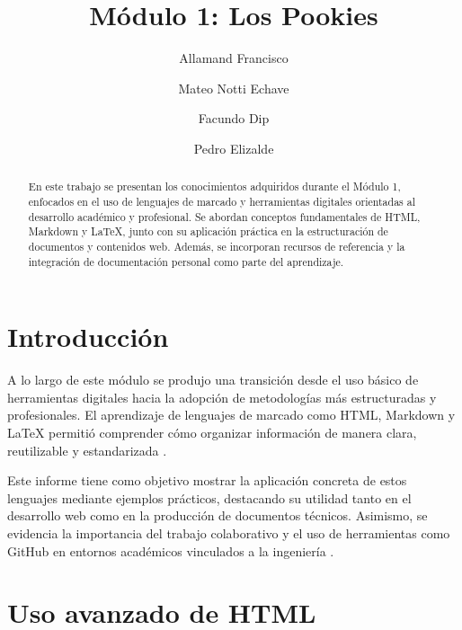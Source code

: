 \documentclass[runningheads]{llncs}
\begin{document}
\title{Módulo 1: Los Pookies}

\author{Allamand Francisco \and
Mateo Notti Echave \and
Facundo Dip \and
Pedro Elizalde}




\maketitle

\begin{abstract}
En este trabajo se presentan los conocimientos adquiridos durante el Módulo 1, enfocados en el uso de lenguajes de marcado y herramientas digitales orientadas al desarrollo académico y profesional. Se abordan conceptos fundamentales de HTML, Markdown y LaTeX, junto con su aplicación práctica en la estructuración de documentos y contenidos web. Además, se incorporan recursos de referencia y la integración de documentación personal como parte del aprendizaje.
\end{abstract}

\section{Introducción}
A lo largo de este módulo se produjo una transición desde el uso básico de herramientas digitales hacia la adopción de metodologías más estructuradas y profesionales. El aprendizaje de lenguajes de marcado como HTML, Markdown y LaTeX permitió comprender cómo organizar información de manera clara, reutilizable y estandarizada \cite{github, markdown, latex}.

Este informe tiene como objetivo mostrar la aplicación concreta de estos lenguajes mediante ejemplos prácticos, destacando su utilidad tanto en el desarrollo web como en la producción de documentos técnicos. Asimismo, se evidencia la importancia del trabajo colaborativo y el uso de herramientas como GitHub en entornos académicos vinculados a la ingeniería \cite{git}.

\section{Uso avanzado de HTML}
\end{document}
